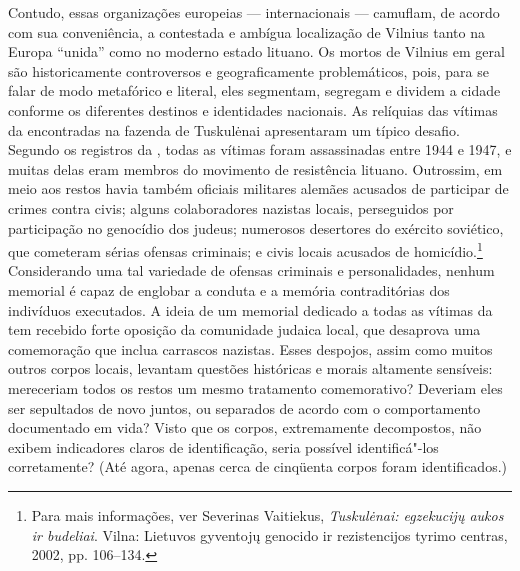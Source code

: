 Contudo, essas organizações europeias --- internacionais --- camuflam, de
acordo com sua conveniência, a contestada e ambígua localização de
Vilnius tanto na Europa ``unida'' como no moderno estado lituano. Os
mortos de Vilnius em geral são historicamente controversos e
geograficamente problemáticos, pois, para se falar de modo metafórico e
literal, eles segmentam, segregam e dividem a cidade conforme os
diferentes destinos e identidades nacionais. As relíquias das vítimas da
 encontradas na fazenda de Tuskulėnai apresentaram um típico
desafio. Segundo os registros da , todas as vítimas foram
assassinadas entre 1944 e 1947, e muitas delas eram membros do movimento
de resistência lituano. Outrossim, em meio aos restos havia também
oficiais militares alemães acusados de participar de crimes contra
civis; alguns colaboradores nazistas locais, perseguidos por
participação no genocídio dos judeus; numerosos desertores do exército
soviético, que cometeram sérias ofensas criminais; e civis locais
acusados de homicídio.\footnote{Para mais informações, ver Severinas Vaitiekus, \textit{Tuskulėnai: egzekucijų aukos ir budeliai}. Vilna: Lietuvos gyventojų genocido ir rezistencijos tyrimo centras, 2002, pp. 106--134.} Considerando uma tal variedade de ofensas criminais e personalidades, nenhum memorial é capaz de englobar a conduta e a
memória contraditórias dos indivíduos executados. A ideia de um memorial
dedicado a todas as vítimas da  tem recebido forte oposição da
comunidade judaica local, que desaprova uma comemoração que inclua
carrascos nazistas. Esses despojos, assim como muitos outros corpos
locais, levantam questões históricas e morais altamente sensíveis:
mereceriam todos os restos um mesmo tratamento comemorativo? Deveriam
eles ser sepultados de novo juntos, ou separados de acordo com o
comportamento documentado em vida? Visto que os corpos, extremamente
decompostos, não exibem indicadores claros de identificação, seria
possível identificá"-los corretamente? (Até agora, apenas cerca de
cinqüenta corpos foram identificados.)


